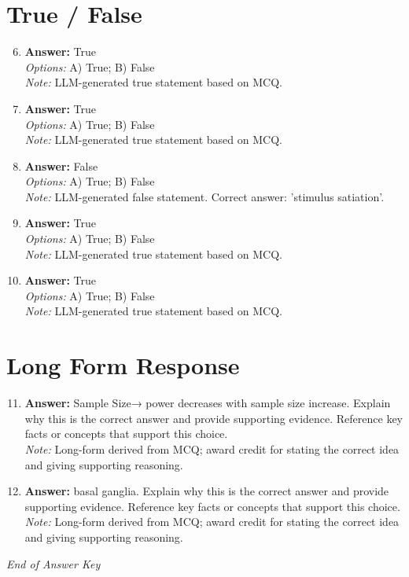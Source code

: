 \documentclass[12pt]{article}
\begin{document}
\section*{True / False}
\begin{enumerate}[label=\arabic*.]
\setcounter{enumi}{5}
\item \textbf{Answer:} True
\\ \textit{Options:} A) True; B) False
\\ \textit{Note:} LLM-generated true statement based on MCQ.
\item \textbf{Answer:} True
\\ \textit{Options:} A) True; B) False
\\ \textit{Note:} LLM-generated true statement based on MCQ.
\item \textbf{Answer:} False
\\ \textit{Options:} A) True; B) False
\\ \textit{Note:} LLM-generated false statement. Correct answer: 'stimulus satiation'.
\item \textbf{Answer:} True
\\ \textit{Options:} A) True; B) False
\\ \textit{Note:} LLM-generated true statement based on MCQ.
\item \textbf{Answer:} True
\\ \textit{Options:} A) True; B) False
\\ \textit{Note:} LLM-generated true statement based on MCQ.
\end{enumerate}

\section*{Long Form Response}
\begin{enumerate}[label=\arabic*.]
\setcounter{enumi}{10}
\item \textbf{Answer:} Sample Size→ power decreases with sample size increase. Explain why this is the correct answer and provide supporting evidence. Reference key facts or concepts that support this choice.
\\ \textit{Note:} Long-form derived from MCQ; award credit for stating the correct idea and giving supporting reasoning.
\item \textbf{Answer:} basal ganglia. Explain why this is the correct answer and provide supporting evidence. Reference key facts or concepts that support this choice.
\\ \textit{Note:} Long-form derived from MCQ; award credit for stating the correct idea and giving supporting reasoning.
\end{enumerate}

\vfill
\noindent\textit{End of Answer Key}
\end{document}
